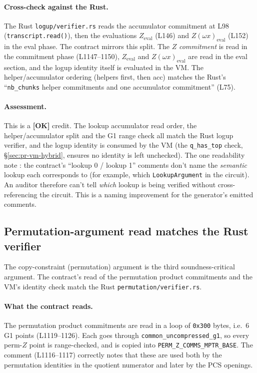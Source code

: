 \paragraph{Cross-check against the Rust.}
The Rust \texttt{logup/verifier.rs} reads the accumulator
commitment at L98 (\texttt{transcript.read()}), then the
evaluations $Z_\text{eval}$ (L146) and
$Z(\omega x)_\text{eval}$ (L152) in the eval phase. The contract
mirrors this split. The $Z$ \emph{commitment} is read in the
commitment phase (L1147--1150), $Z_\text{eval}$ and
$Z(\omega x)_\text{eval}$ are read in the eval section, and the
logup identity itself is evaluated in the VM. The helper/accumulator
ordering (helpers first, then acc) matches the Rust's
``\texttt{nb\_chunks} helper commitments and one accumulator
commitment'' (L75).

\paragraph{Assessment.} This is a
\textcolor{tracegreen}{\textbf{[OK]}} credit. The lookup
accumulator read order, the helper/accumulator split and the
G1 range check all match the Rust logup verifier, and the
logup identity is consumed by the VM (the
\texttt{q\_has\_top} check, \S\ref{sec:pr-vm-hybrid}, ensures
no identity is left unchecked). The one readability note
: the contract's ``lookup 0 / lookup 1'' comments
don't name the \emph{semantic} lookup each corresponds to (for
example, which \texttt{LookupArgument} in the circuit). An auditor
therefore can't tell \emph{which} lookup is being verified without
cross-referencing the circuit. This is a naming improvement for the
generator's emitted comments.

\subsection{Permutation-argument read matches the Rust verifier}
\label{sec:pr-perm-arg}

The copy-constraint (permutation) argument is the third
soundness-critical argument. The contract's read of the
permutation product commitments and the VM's identity check
match the Rust \texttt{permutation/\allowbreak{}verifier.rs}.

\paragraph{What the contract reads.}
The permutation product commitments are read in a loop of
\texttt{0x300} bytes, i.e.\ 6 G1 points (L1119--1126). Each goes
through \texttt{common\_\allowbreak{}uncompressed\_\allowbreak{}g1}, so every perm-$Z$ point
is range-checked, and is copied into \texttt{PERM\_\allowbreak{}Z\_\allowbreak{}COMMS\_\allowbreak{}MPTR\_\allowbreak{}BASE}.
The comment (L1116--1117) correctly notes that these are used both
by the permutation identities in the quotient numerator and later
by the PCS openings.


